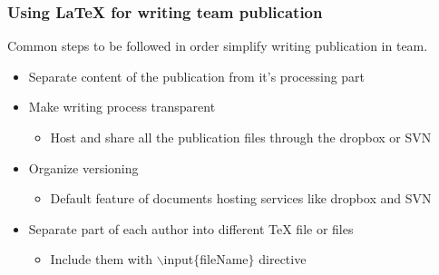 \begin{frame}  \frametitle{Using LaTeX for writing \textbf{team} publication}
	
	Common steps to be followed in order simplify writing publication in team.
	
	\vspace{0.4cm}
	
	
	\begin{itemize}	
		\item Separate content of the publication from it's processing part
		\item Make writing process transparent
		\begin{itemize}
			\item Host and share all the publication files through the dropbox or SVN
		\end{itemize}
		\item Organize versioning
		\begin{itemize}
			\item Default feature of documents hosting services like dropbox and SVN
		\end{itemize}
		\item Separate part of each author into different TeX file or files
		\begin{itemize}
			\item Include them with {\color{command}$\backslash$input\color{braces}$\{${\color{black}fileName}$\}$\color{black}} directive
		\end{itemize}
	\end{itemize}
\end{frame}


